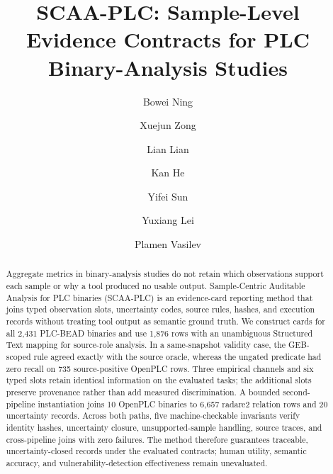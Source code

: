 \documentclass[manuscript,screen,review]{acmart}
\begin{document}
\title{SCAA-PLC: Sample-Level Evidence Contracts for PLC Binary-Analysis Studies}

\author{Bowei Ning}

\author{Xuejun Zong}
\author{Lian Lian}
\author{Kan He}
\author{Yifei Sun}
\author{Yuxiang Lei}

\author{Plamen Vasilev}

\renewcommand{\shortauthors}{Ning et al.}

\begin{abstract}
Aggregate metrics in binary-analysis studies do not retain which observations support each sample or why a tool produced no usable output. Sample-Centric Auditable Analysis for PLC binaries (SCAA-PLC) is an evidence-card reporting method that joins typed observation slots, uncertainty codes, source rules, hashes, and execution records without treating tool output as semantic ground truth. We construct cards for all 2{,}431 PLC-BEAD binaries and use 1{,}876 rows with an unambiguous Structured Text mapping for source-role analysis. In a same-snapshot validity case, the GEB-scoped rule agreed exactly with the source oracle, whereas the ungated predicate had zero recall on 735 source-positive OpenPLC rows. Three empirical channels and six typed slots retain identical information on the evaluated tasks; the additional slots preserve provenance rather than add measured discrimination. A bounded second-pipeline instantiation joins 10 OpenPLC binaries to 6{,}657 radare2 relation rows and 20 uncertainty records. Across both paths, five machine-checkable invariants verify identity hashes, uncertainty closure, unsupported-sample handling, source traces, and cross-pipeline joins with zero failures. The method therefore guarantees traceable, uncertainty-closed records under the evaluated contracts; human utility, semantic accuracy, and vulnerability-detection effectiveness remain unevaluated.
\end{abstract}
\end{document}
